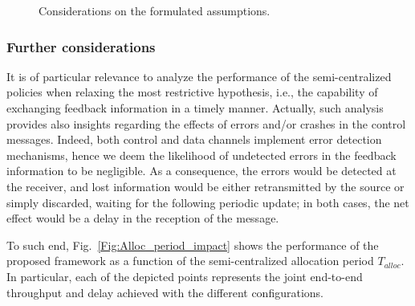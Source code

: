 \begin{figure}[tbp]
  \hfill
  
   \caption{Considerations on the formulated assumptions.}
  \label{Fig:Assump}
      \vspace{-.6cm} 

\end{figure}

\vspace{-.3cm}
\subsubsection{Further considerations}

It is of particular relevance to analyze the performance of the semi-centralized policies when relaxing the most restrictive hypothesis, i.e., the capability of exchanging feedback information in a timely manner.
Actually, such analysis provides also insights regarding the effects of errors and/or crashes in the control messages. Indeed, both control and data channels implement error detection mechanisms, hence we deem the likelihood of undetected errors in the feedback information to be negligible. As a consequence, the errors would be detected at the receiver, and lost information would be either retransmitted by the source or simply discarded, waiting for the following periodic update; in both cases, the net effect would be a delay in the reception of the message.

To such end, Fig.~\ref{Fig:Alloc_period_impact} shows the performance of the proposed framework as a function of the semi-centralized allocation period $T_{alloc}$. In particular, each of the depicted points represents the joint end-to-end throughput and delay achieved with the different configurations.


